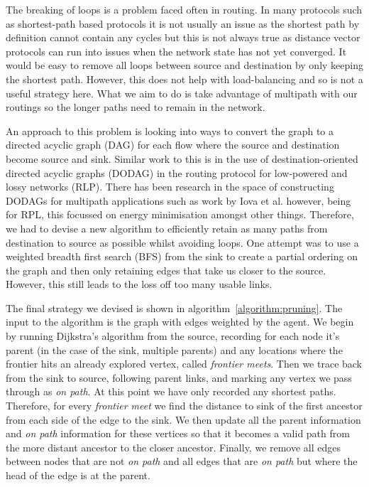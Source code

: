 The breaking of loops is a problem faced often in routing. In many protocols such as shortest-path based protocols it is not usually an issue as the shortest path by definition cannot contain any cycles but this is not always true as distance vector protocols can run into issues when the network state has not yet converged. It would be easy to remove all loops between source and destination by only keeping the shortest path. However, this does not help with load-balancing and so is not a useful strategy here. What we aim to do is take advantage of multipath with our routings so the longer paths need to remain in the network.

An approach to this problem is looking into ways to convert the graph to a directed acyclic graph (DAG) for each flow where the source and destination become source and sink. Similar work to this is in the use of destination-oriented directed acyclic graphs (DODAG) in the routing protocol for low-powered and lossy networks (RLP)\cite{rfc6550}. There has been research in the space of constructing DODAGs for multipath applications such as work by Iova et al.\cite{iova2015using} however, being for RPL, this focussed on energy minimisation amongst other things.
Therefore, we had to devise a new algorithm to efficiently retain as many paths from destination to source as possible whilst avoiding loops. One attempt was to use a weighted breadth first search (BFS) from the sink to create a partial ordering on the graph and then only retaining edges that take us closer to the source. However, this still leads to the loss off too many usable links.

The final strategy we devised is shown in algorithm~\ref{algorithm:pruning}. The input to the algorithm is the graph with edges weighted by the agent. We begin by running Dijkstra's algorithm from the source, recording for each node it's parent (in the case of the sink, multiple parents) and any locations where the frontier hits an already explored vertex, called \emph{frontier meets}. Then we trace back from the sink to source, following parent links, and marking any vertex we pass through as \emph{on path}. At this point we have only recorded any shortest paths. Therefore, for every \emph{frontier meet} we find the distance to sink of the first ancestor from each side of the edge to the sink. We then update all the parent information and \emph{on path} information for these vertices so that it becomes a valid path from the more distant ancestor to the closer ancestor. Finally, we remove all edges between nodes that are not \emph{on path} and all edges that are \emph{on path} but where the head of the edge is at the parent.

